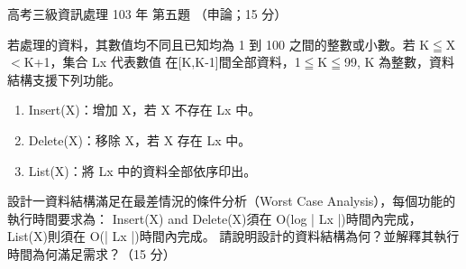 \begin{pastexam}[label={px:gk3-103-ds-05}]{高考三級資訊處理 103 年 第五題}
（申論；15 分）

若處理的資料，其數值均不同且已知均為 1 到 100 之間的整數或小數。若 K$\leqq$X$<$K+1，集合 Lx 代表數值
在[K,K-1]間全部資料，1$\leqq$K$\leqq$99, K 為整數，資料結構支援下列功能。
\begin{enumerate}[leftmargin=3em, label=\textit{\arabic*.}]
\item Insert(X)：增加 X，若 X 不存在 Lx 中。
\item Delete(X)：移除 X，若 X 存在 Lx 中。
\item List(X)：將 Lx 中的資料全部依序印出。
\end{enumerate}
設計一資料結構滿足在最差情況的條件分析（Worst Case Analysis），每個功能的執行時間要求為：
Insert(X) and Delete(X)須在 O(log | Lx |)時間內完成，List(X)則須在 O(| Lx |)時間內完成。
請說明設計的資料結構為何？並解釋其執行時間為何滿足需求？（15 分）
\end{pastexam}

